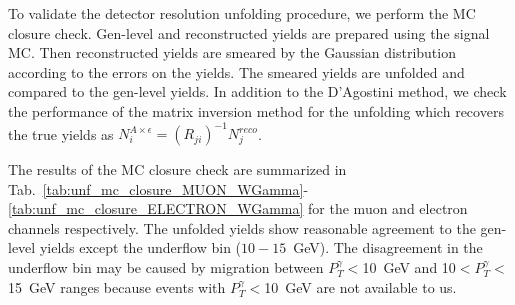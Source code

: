 To validate the detector resolution unfolding procedure, we perform the MC closure check. Gen-level and reconstructed yields are prepared using the signal MC. Then reconstructed yields are smeared by the Gaussian distribution according to the errors on the yields. The smeared yields are unfolded and compared to the gen-level yields. In addition to the D'Agostini method, we check the performance of the matrix inversion method for the unfolding which recovers the true yields as $N^{A\times\epsilon}_i = (R_{ji})^{-1} N^{reco}_j$. 

The results of the MC closure check are summarized in Tab.~\ref{tab:unf_mc_closure_MUON_WGamma}-\ref{tab:unf_mc_closure_ELECTRON_WGamma} for the muon and electron channels respectively. The unfolded yields show reasonable agreement to the gen-level yields except the underflow bin ($10-15$~GeV). The disagreement in the underflow bin may be caused by migration between $P_T^{\gamma}<$10~GeV and 10$<P_T^{\gamma}<$15~GeV ranges because events with $P_T^{\gamma}<$10~GeV are not available to us.  




